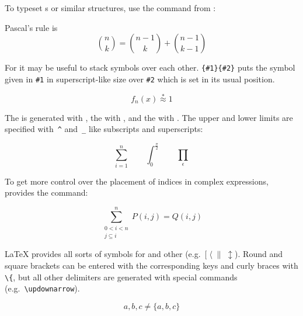 To typeset s or similar structures, use
the command  from :
\begin{example}
Pascal's rule is
\begin{equation*}
 \binom{n}{k} =\binom{n-1}{k}
 + \binom{n-1}{k-1}
\end{equation*}
\end{example}

For  it may be useful to stack symbols over each other.
\verb|{#1}{#2}| puts the symbol given
in \verb|#1| in superscript-like size over \verb|#2| which
is set in its usual position.
\begin{example}
\begin{equation*}
 f_n(x) \stackrel{*}{\approx} 1
\end{equation*}
\end{example}

The \textbf{} is generated with , the
\textbf{} with , and the \textbf{}
with . The upper and lower limits are specified with~\verb|^|
and~\verb|_| like subscripts and superscripts:
\begin{example}
\begin{equation*}
\sum_{i=1}^n \qquad
\int_0^{\frac{\pi}{2}} \qquad
\prod_\epsilon
\end{equation*}
\end{example}

To get more control over the placement of indices in complex
expressions,  provides the  command:
\begin{example}
\begin{equation*}
\sum^n_{\substack{0<i<n \\ 
        j\subseteq i}}
   P(i,j) = Q(i,j)
\end{equation*}
\end{example}



\LaTeX{} provides all sorts of symbols for \textbf{} and other
\textbf{} (e.g.~$[\;\langle\;\|\;\updownarrow$).
Round and square brackets can be entered with the corresponding keys and
curly braces with \verb|\{|, but all other delimiters are generated with
special commands (e.g.~\verb|\updownarrow|).
\begin{example}
\begin{equation*}
{a,b,c} \neq \{a,b,c\}
\end{equation*}
\end{example}

